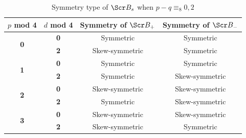 \documentclass[10pt,a4paper,twoside,reqno]{amsart}
\theoremstyle{plain}
\theoremstyle{definition}
\theoremstyle{remark}
\def\scB{\Scr B}
\begin{document}
\begin{table}
\centering
\caption{Symmetry type of $\scB_{s}$ when $p-q \equiv_8 0,2$}
\label{tab:symmetry_grid_singlereal_modified}
\renewcommand{\arraystretch}{1.3} %

\begin{tabular}{|c|c|c|c|}
\hline %
\textbf{$p$ mod 4} & \textbf{$d$ mod 4} & \textbf{Symmetry of $\scB_{+}$} & \textbf{Symmetry of $\scB_{-}$} \\ \hline %
\multirow{2}{*}{\textbf{0}} & \textbf{0} & Symmetric & Symmetric \\ \cline{2-4}
& \textbf{2} & Skew-symmetric & Symmetric \\ \hline
\multirow{2}{*}{\textbf{1}} & \textbf{0} & Symmetric & Symmetric \\ \cline{2-4}
& \textbf{2} & Symmetric & Skew-symmetric \\ \hline
\multirow{2}{*}{\textbf{2}} & \textbf{0} & Skew-symmetric & Skew-symmetric \\ \cline{2-4}
& \textbf{2} & Symmetric & Skew-symmetric \\ \hline
\multirow{2}{*}{\textbf{3}} & \textbf{0} & Skew-symmetric & Skew-symmetric \\ \cline{2-4}
& \textbf{2} & Skew-symmetric & Symmetric \\ \hline %
\end{tabular}
\end{table}
\end{document}
